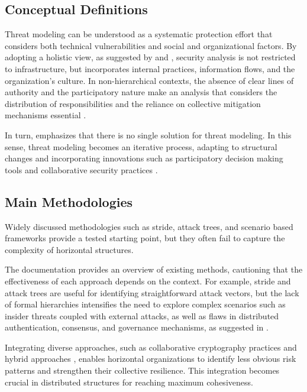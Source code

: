 \subsection{Conceptual Definitions}
\label{subsec:conceptual_definitions}

Threat modeling can be understood as a systematic protection effort that
considers both technical vulnerabilities and social and organizational factors.
By adopting a holistic view, as suggested by
\cite{ThreatModelingAsABasisForSecurityRequirements} and
\cite{AdvancedThreatModeling}, security analysis is not restricted to
infrastructure, but incorporates internal practices, information flows, and the
organization's culture. In non-hierarchical contexts, the absence of clear lines
of authority and the participatory nature make an analysis that considers the
distribution of responsibilities and the reliance on collective mitigation
mechanisms essential \cite{Colbac}.

In turn, \cite{DemystifyingTheThreatModelingProcess} emphasizes that there is no
single solution for threat modeling. In this sense, threat modeling becomes an
iterative process, adapting to structural changes and incorporating innovations
such as participatory decision making tools and collaborative security practices
\cite{ParticipatoryThreatModelling}.

\subsection{Main Methodologies}
\label{subsec:main_methodologies}

Widely discussed methodologies such as \gls{stride}, attack trees, and
scenario based frameworks \cite{EvaluationofCompetingThreatModeling} provide a
tested starting point, but they often fail to capture the complexity of
horizontal structures.

The documentation \cite{ThreatModelingASummaryOfAvailableMethods} provides an
overview of existing methods, cautioning that the effectiveness of each approach
depends on the context. For example, \gls{stride} and attack trees are useful
for identifying straightforward attack vectors, but the lack of formal
hierarchies intensifies the need to explore complex scenarios such as insider
threats coupled with external attacks, as well as flaws in distributed
authentication, consensus, and governance mechanisms, as suggested in
\cite{Colbac, AttackTrees, STRIDEthreatmodelingforcyberphysical}.

Integrating diverse approaches, such as collaborative cryptography practices
\cite{AbcCrypto} and hybrid approaches \cite{CoReTM}, enables horizontal
organizations to identify less obvious risk patterns and strengthen their
collective resilience. This integration becomes crucial in distributed
structures for reaching maximum cohesiveness.

